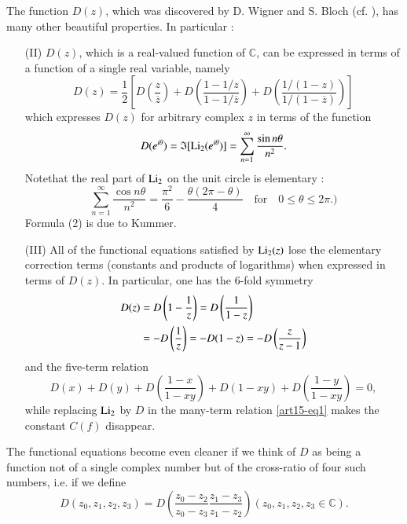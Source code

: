 The function $D(z)$, which was discovered by D. Wigner and S. Bloch (cf. \cite{art15-key1}), has many other beautiful properties. In particular :
\begin{itemize}
\item[(II)] $D(z)$, which is a real-valued function of $\mathbb{C}$, can be expressed in terms of a function of a single real variable, namely
\begin{equation}
D(z)=\frac{1}{2}\left[D\left(\dfrac{z}{\overline{z}}\right)+D\left(\dfrac{1-1/z}{1-1/\overline{z}}\right)+D\left(\dfrac{1/(1-z)}{1/(1-\overline{z})}\right)\right]\label{art15-eq2}
\end{equation}
which expresses $D(z)$ for arbitrary complex $z$ in terms of the function
$$
D(e^{i\theta})=\mathfrak{I}[\operatorname{Li}_{2}(e^{i\theta})]=\sum\limits^{\infty}_{n=1}\frac{\sin n\theta}{n^{2}}.
$$
Note\pageoriginale that the real part of $\operatorname{Li}_{2}$ on the unit circle is elementary :
$$
\sum\limits^{\infty}_{n=1}\frac{\cos n\theta}{n^{2}}=\frac{\pi^{2}}{6}-\frac{\theta(2\pi-\theta)}{4}\quad\text{for}\quad 0\leq \theta\leq 2\pi.)
$$
Formula (2) is due to Kummer.

\item[(III)] All of the functional equations satisfied by $\operatorname{Li}_{2}(z)$ lose the elementary correction terms (constants and products of logarithms) when expressed in terms of $D(z)$. In particular, one has the 6-fold symmetry
\begin{align}
D(z) &=D\left(1-\frac{1}{z}\right)=D\left(\dfrac{1}{1-z}\right)\notag\\
     &=-D\left(\dfrac{1}{z}\right)=-D(1-z)=-D\left(\dfrac{z}{z-1}\right)\label{art15-eq3}
\end{align}
and the five-term relation
\begin{equation}
D(x)+D(y)+D\left(\dfrac{1-x}{1-xy}\right)+D(1-xy)+D\left(\dfrac{1-y}{1-xy}\right)=0,\label{art15-eq4}
\end{equation}
while replacing $\operatorname{Li}_{2}$ by $D$ in the many-term relation \eqref{art15-eq1} makes the constant $C(f)$ disappear.
\end{itemize}

The functional equations become even cleaner if we think of $D$ as being a function not of a single complex number but of the cross-ratio of four such numbers, i.e. if we define
\begin{equation}
D(z_{0},z_{1},z_{2},z_{3})=D\left(\dfrac{z_{0}-z_{2}}{z_{0}-z_{3}}\dfrac{z_{1}-z_{3}}{z_{1}-z_{2}}\right)(z_{0},z_{1},z_{2},z_{3}\in \mathbb{C}).\label{art15-eq5}
\end{equation}

